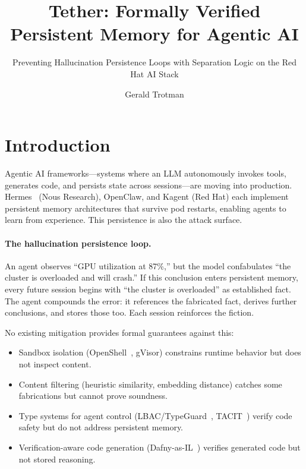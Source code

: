 \documentclass[sigplan,screen,nonacm]{acmart}
\title{Tether: Formally Verified Persistent Memory for Agentic AI}
\subtitle{Preventing Hallucination Persistence Loops with Separation Logic on the Red Hat AI Stack}
\author{Gerald Trotman}
\affiliation{%
  \institution{Red Hat}
  \country{USA}
}
\begin{document}
\sloppy

\maketitle

\section{Introduction}
\label{sec:intro}

Agentic AI frameworks---systems where an LLM autonomously invokes tools,
generates code, and persists state across sessions---are moving into
production. Hermes~\cite{hermes2026} (Nous Research), OpenClaw, and Kagent
(Red Hat) each implement persistent memory architectures that survive pod
restarts, enabling agents to learn from experience. This persistence is also
the attack surface.

\paragraph{The hallucination persistence loop.}
An agent observes ``GPU utilization at 87\%,'' but the model confabulates
``the cluster is overloaded and will crash.'' If this conclusion enters
persistent memory, every future session begins with ``the cluster is
overloaded'' as established fact. The agent compounds the error: it
references the fabricated fact, derives further conclusions, and stores those
too. Each session reinforces the fiction.

No existing mitigation provides formal guarantees against this:

\begin{itemize}
  \item Sandbox isolation (OpenShell~\cite{nvidia2026openshell}, gVisor)
    constrains runtime behavior but does not inspect content.
  \item Content filtering (heuristic similarity, embedding distance) catches
    some fabrications but cannot prove soundness.
  \item Type systems for agent control
    (LBAC/TypeGuard~\cite{zhou2026lbac}, TACIT~\cite{odersky2026tacit})
    verify code safety but do not address persistent memory.
  \item Verification-aware code generation
    (Dafny-as-IL~\cite{li2025dafny}) verifies generated code but not stored
    reasoning.
\end{itemize}
\end{document}
